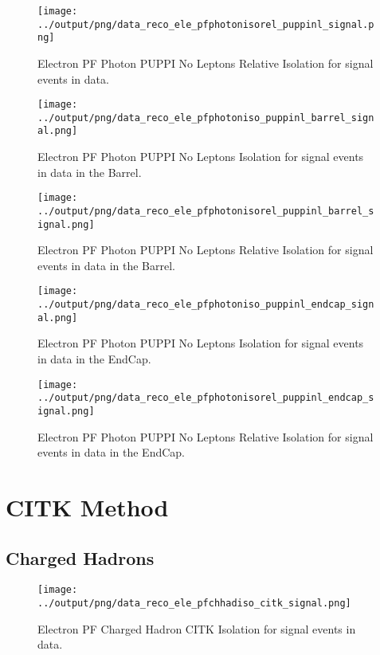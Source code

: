 \documentclass[11pt]{book}
\begin{document}
\begin{figure}[htb]
\centering
\texttt{[image: ../output/png/data\_reco\_ele\_pfphotonisorel\_puppinl\_signal.png]}
\caption{Electron PF Photon PUPPI No Leptons Relative Isolation for signal events in data.}
\label{fig:data_ele_pfphotonisorel_puppinl_signal}
\end{figure}

\begin{figure}[htb]
\centering
\texttt{[image: ../output/png/data\_reco\_ele\_pfphotoniso\_puppinl\_barrel\_signal.png]}
\caption{Electron PF Photon PUPPI No Leptons Isolation for signal events in data in the Barrel.}
\label{fig:data_ele_pfphotoniso_puppinl_barrel_signal}
\end{figure}

\begin{figure}[htb]
\centering
\texttt{[image: ../output/png/data\_reco\_ele\_pfphotonisorel\_puppinl\_barrel\_signal.png]}
\caption{Electron PF Photon PUPPI No Leptons Relative Isolation for signal events in data in the Barrel.}
\label{fig:data_ele_pfphotonisorel_puppinl_barrel_signal}
\end{figure}

\begin{figure}[htb]
\centering
\texttt{[image: ../output/png/data\_reco\_ele\_pfphotoniso\_puppinl\_endcap\_signal.png]}
\caption{Electron PF Photon PUPPI No Leptons Isolation for signal events in data in the EndCap.}
\label{fig:data_ele_pfphotoniso_puppinl_endcap_signal}
\end{figure}

\begin{figure}[htb]
\centering
\texttt{[image: ../output/png/data\_reco\_ele\_pfphotonisorel\_puppinl\_endcap\_signal.png]}
\caption{Electron PF Photon PUPPI No Leptons Relative Isolation for signal events in data in the EndCap.}
\label{fig:data_ele_pfphotonisorel_puppinl_endcap_signal}
\end{figure}
\clearpage

\section{CITK Method}
\subsection{Charged Hadrons}
\begin{figure}[htb]
\centering
\texttt{[image: ../output/png/data\_reco\_ele\_pfchhadiso\_citk\_signal.png]}
\caption{Electron PF Charged Hadron CITK Isolation for signal events in data.}
\label{fig:data_ele_pfchhadiso_citk_signal}
\end{figure}
\end{document}

